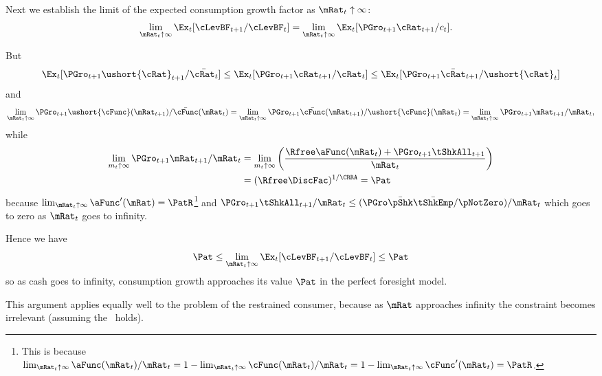 \documentclass[./BufferStockTheory.tex]{subfiles}
\begin{document}
\renewcommand{\figFile}{cFuncBounds}
\hypertarget{\figFile}{}



Next we establish the limit of the expected consumption growth factor
as $\mRat_{t} \uparrow \infty$:
\begin{align}
\lim_{\mRat_{t} \uparrow \infty} \Ex_{t}[
\cLevBF_{t+1}/\cLevBF_{t}]  & = \lim_{\mRat_{t} \uparrow \infty} \Ex_{t}[
{\PGro}_{t+1} {\cRat}_{t+1}/c_{t}]. \notag
\end{align}

But
\begin{align*}
\Ex_{t}[{\PGro}_{t+1} {\ushort{\cRat}}_{t+1}/\bar{\cRat_{t}}] \leq \Ex_{t}[{\PGro}_{t+1} {\cRat}_{t+1}/\cRat_{t}] \leq \Ex_{t}[{\PGro}_{t+1} {\bar{\cRat}}_{t+1}/\ushort{\cRat}_{t}]
\end{align*}
and
\begin{equation}  \label{eq:xttoinfty}
\lim_{\mRat_t \uparrow \infty} \PGro_{t+1}\ushort{\cFunc}(\mRat_{t+1})/\bar{\cFunc}(\mRat_t) =
\lim_{\mRat_{t} \uparrow \infty} \PGro_{t+1}\bar{\cFunc}(\mRat_{t+1})/\ushort{\cFunc}(\mRat_t) =
\lim_{\mRat_{t} \uparrow \infty}\PGro_{t+1} \mRat_{t+1}/\mRat_t,  \notag
\end{equation}
while \hypertarget{xtp1toinfty}{}
\begin{align}  \label{eq:xtp1toinfty}
\lim_{m_{t} \uparrow \infty} \PGro_{t+1} \mRat_{t+1}/\mRat_t  & = \lim_{m_{t} \uparrow \infty}
\left(\frac{\Rfree \aFunc(\mRat_t)+{\PGro}_{t+1}\tShkAll_{t+1}}{\mRat_t}\right)
\\  & = (\Rfree \DiscFac)^{1/\CRRA} = \Pat
\end{align}
because $\lim_{\mRat_{t}\uparrow \infty} \aFunc^{\prime}(\mRat)=\PatR$\footnote{This is because $\lim_{\mRat_{t}\uparrow \infty} \aFunc(\mRat_{t})/\mRat_{t}=1-\lim_{\mRat_{t}\uparrow \infty} \cFunc(\mRat_{t})/\mRat_{t}=1-\lim_{\mRat_{t}\uparrow \infty}\cFunc^{\prime}(\mRat_{t})=\PatR$.} and
$\PGro_{t+1}\tShkAll_{t+1}/\mRat_{t} \leq (\PGro \bar{\pShk} \bar{\tShkEmp}/\pNotZero )/\mRat_{t}$ which
goes to zero as $\mRat_{t}$ goes to infinity.

Hence we have
\begin{equation}
  {\Pat}  \leq \lim_{\mRat_{t} \uparrow \infty} \Ex_{t}[\cLevBF_{t+1}/\cLevBF_{t}] \leq {\Pat} \nonumber
\end{equation}
so as cash goes to infinity, consumption growth approaches its
value $\Pat$ in the perfect foresight model.

This argument applies equally well to the problem of the restrained
consumer, because as $\mRat$ approaches infinity the constraint becomes
irrelevant (assuming the \FHWC~holds).
\end{document}
